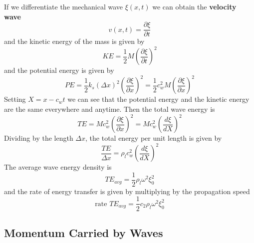 \documentclass[12pt, a4paper, oneside, openright, titlepage]{book}
\begin{document}
If we differentiate the mechanical wave $\xi(x,t)$ we can obtain the \textbf{velocity wave}
\begin{equation*}
    v(x,t) = \frac{\partial \xi}{\partial t}
\end{equation*}
and the kinetic energy of the mass is given by
\begin{equation*}
    KE = \frac{1}{2}M\left(\frac{\partial\xi}{\partial t}\right)^2
\end{equation*}
and the potential energy is given by
\begin{equation*}
    PE = \frac{1}{2}k_s\left(\Delta x\right)^2\left(\frac{\partial\xi}{\partial x}\right)^2 = \frac{1}{2}c_w^2M\left(\frac{\partial \xi}{\partial x}\right)^2
\end{equation*}
Setting $X = x-c_wt$ we can see that the potential energy and the kinetic energy are the same everywhere and anytime. Then the total wave energy is
\begin{equation*}
    TE = Mc_w^2\left(\frac{\partial\xi}{\partial x}\right)^2 = Mc_w^2\left(\frac{d\xi}{dX}\right)^2
\end{equation*}
Dividing by the length $\Delta x$, the total energy per unit length is given by
\begin{equation*}
    \frac{TE}{\Delta x} = \rho_lc_w^2\left(\frac{d\xi}{dX}\right)^2
\end{equation*}
The average wave energy density is
\begin{equation*}
    TE_{avg} = \frac{1}{2}\rho_l\omega^2\xi_0^2
\end{equation*}
and the rate of energy transfer is given by multiplying by the propagation speed
\begin{equation*}
    \text{rate }TE_{avg} = \frac{1}{2}c_2\rho_l\omega^2\xi_0^2
\end{equation*}


\subsection{Momentum Carried by Waves}
\end{document}
